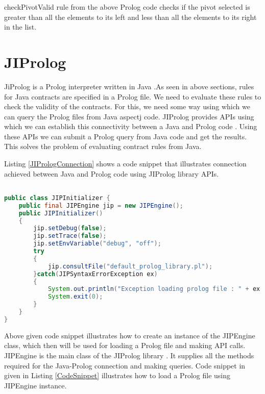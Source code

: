 checkPivotValid rule from the above Prolog code checks if the pivot selected is greater than all the elements to its left and less than all the elements to its right in the list.

\section{JIProlog}

JiProlog is a Prolog interpreter written in Java \cite{JIProlog}.As seen in above sections, rules for Java contracts are specified in a Prolog file. We need to evaluate these rules to check the validity of the contracts. For this, we need some way using which we can query the Prolog files from Java aspectj code.
JIProlog provides APIs using which we can establish this connectivity between a Java and Prolog code \cite{JIProlog}. Using these APIs we can submit a Prolog query from Java code and get the results. This solves the problem of evaluating contract rules from Java.

\begin{minipage}{\linewidth}
Listing \ref{JIPrologConnection} shows a code snippet that illustrates connection achieved between Java and Prolog code using JIProlog library APIs.
     
\begin{lstlisting}[frame=single, language=Java,caption={Creating JIPEngine instance}, label={JIPrologConnection}, captionpos=b, breaklines=true, showstringspaces=false]

public class JIPInitializer {
	public final JIPEngine jip = new JIPEngine(); 
	public JIPInitializer()
	{
		jip.setDebug(false);
		jip.setTrace(false);
		jip.setEnvVariable("debug", "off");
		try
		{
			jip.consultFile("default_prolog_library.pl");	
		}catch(JIPSyntaxErrorException ex)
		{
			System.out.println("Exception loading prolog file : " + ex.getMessage());
		    System.exit(0);
		}
	}
}
\end{lstlisting}
\end{minipage}

Above given code snippet illustrates how to create an instance of the JIPEngine class, which then will be used for loading a Prolog file and making API calls. JIPEngine is the main class of the JIProlog library \cite{JIProlog}. It supplies all the methods required for the Java-Prolog connection and making queries. Code snippet in given in Listing \ref{CodeSnippet} illustrates how to load a Prolog file using JIPEngine instance. \linebreak

